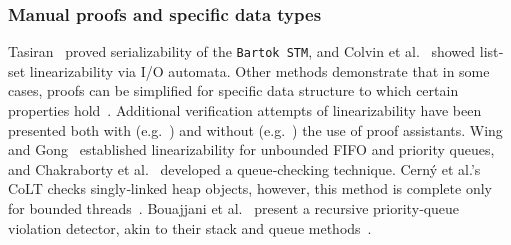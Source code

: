 \subsubsection{Manual proofs and specific data types}

Tasiran~\cite{Ta08} proved serializability of the \texttt{Bartok STM}, and Colvin et al.~\cite{CoGrLuMo06} showed list‐set linearizability via I/O automata. 
%
Other methods demonstrate that in some cases, proofs can be simplified for specific data structure to which certain properties hold~\cite{BoEmEnMu17, FeEnMoRiSh18}.
%
Additional verification attempts of linearizability have been presented both 
with (e.g.~\cite{CoGrLuMo06}) and without (e.g.~\cite{DoGrLuMo04}) the use of 
proof assistants.
%
Wing and Gong~\cite{WiGo93} established linearizability for unbounded FIFO and priority queues, and Chakraborty et al.~\cite{ChHeSeVa15} developed a queue‐checking technique. Cerný et al.’s CoLT checks singly‐linked heap objects, however, this method is complete only for bounded threads~\cite{CeRaZuChAl10}. Bouajjani et al.~\cite{BoEnWa17} present a recursive priority‐queue violation detector, akin to their stack and queue methods~\cite{BoEmEnHa18}.

%
%
%

